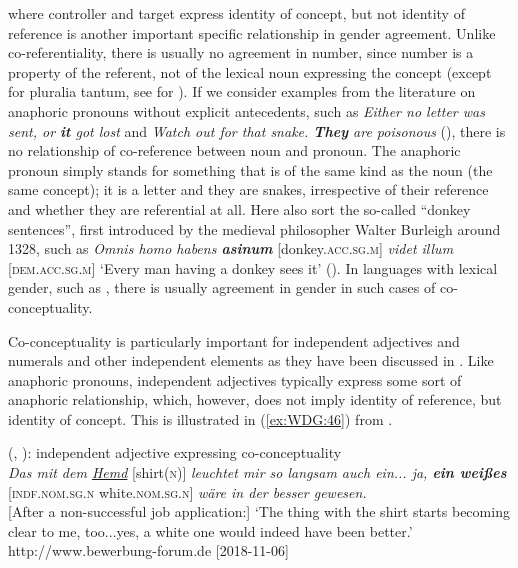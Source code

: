 \documentclass[output=collectionpaper]{langsci/langscibook}
\begin{document}
 \textendash{} where controller and target express identity of concept, but not identity of reference \textendash{} is another important specific relationship in gender agreement. Unlike co-referentiality, there is usually no agreement in number, since number is a property of the referent, not of the lexical noun expressing the concept (except for pluralia tantum, see \citealt{Waelchli2017} for ). If we consider examples from the literature on anaphoric pronouns without explicit antecedents, such as \textit{Either no letter was sent, or \textbf{it} got lost} and \textit{Watch out for that snake. \textbf{They} are poisonous} (\citealt[211]{Bosch1988}), there is no relationship of co-reference between noun and pronoun. The anaphoric pronoun simply stands for something that is of the same kind as the noun (the same concept); it is a letter and they are snakes, irrespective of their reference and whether they are referential at all. Here also sort the so-called ``donkey sentences'', first introduced by the medieval philosopher Walter Burleigh around 1328, such as  \textit{Omnis homo habens \textbf{asinum}} [donkey.\textsc{acc.sg.m}] \textit{videt illum} [\textsc{dem.acc.sg.m}] `Every man having a donkey sees it' (\citealt[269]{Seuren2009}). In languages with lexical gender, such as , there is usually agreement in gender in such cases of co-conceptuality.

Co-conceptuality is particularly important for independent adjectives and numerals and other independent elements as they have been discussed in . Like anaphoric pronouns, independent adjectives typically express some sort of anaphoric relationship, which, however, does not imply identity of reference, but identity of concept. This is illustrated in (\ref{ex:WDG:46}) from .

\ea\label{ex:WDG:46}
 (, ): independent adjective expressing co-conceptuality\\
\textit{Das mit dem \uline{Hemd}} [shirt(\textsc{n})] \textit{leuchtet mir so langsam auch ein... ja, \textbf{ein weißes}} [\textsc{indf.nom.sg.n} white.\textsc{nom.sg.n}] \textit{wäre in der  besser gewesen.}\\
{[}After a non-successful job application:{]} `The thing with the shirt starts becoming clear to me, too...yes, a white one would indeed have been better.'\\
http://www.bewerbung-forum.de [2018-11-06] \\
\z
\end{document}
